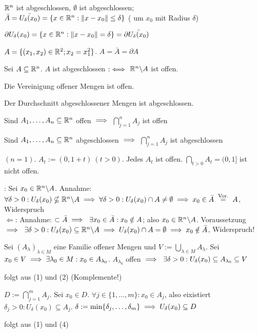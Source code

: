 \documentclass[a4paper,twoside,DIV15,BCOR12mm,chapterprefix=true,headings=twolinechapter]{scrbook}
\begin{document}
\begin{beispiele}
\item $\mathbb{R}^n$ ist abgeschlossen, $\emptyset$ ist abgeschlossen; \\ 
  $\bar{A}=\bar{U_\delta(x_0)} = \{x\in\mathbb{R}^n: \|x-x_0\| \le \delta\}$ ( um $x_0$ mit Radius $\delta$)
\item $\partial U_\delta(x_0) = \{x\in\mathbb{R}^n: \|x-x_0\|=\delta\} = \partial \bar{U_\delta(x_0)}$
\item $A = \{(x_1,x_2)\in\mathbb{R}^2; x_2 = x_1^2\}$. $A=\bar{A}=\partial A$
\end{beispiele}

\begin{satz}
 \begin{liste}
 \item Sei $A\subseteq\mathbb{R}^n$. $A$ ist abgeschlossen $:\iff$  $\mathbb{R}^n\backslash A$ ist offen.
 \item Die Vereinigung offener Mengen ist offen.
 \item Der Durchschnitt abgeschlossener Mengen ist abgeschlossen.
 \item Sind $A_1,\ldots,A_n\subseteq\mathbb{R}^n$ offen $\implies$ $\bigcap_{j=1}^nA_j$ ist offen
 \item Sind $A_1,\ldots,A_n\subseteq\mathbb{R}^n$ abgeschlossen $\implies$ $\bigcap_{j=1}^nA_j$ ist abgeschlossen
 \end{liste}
\end{satz}

\begin{beispiel}
  $(n=1)$. $A_t := (0,1+t)\ (t>0)$. Jedes $A_t$ ist offen. $\bigcap_{t>0}A_t = (0,1]$ ist nicht offen.
\end{beispiel}

\begin{beweise}
 \item \glqq\folgt\grqq: Sei $x_0\in\mathbb{R}^n\backslash A$. Annahme: $\forall \delta>0: U_\delta(x_0) \nsubseteq \MdR^n\backslash A\folgt\forall\delta>0: U_\delta(x_0)\cap A\ne\emptyset \folgt x_0\in\bar{A} \gleichnach{Vor.} A$, Widerspruch \\
 \glqq$\Leftarrow$\grqq: Annahme: $\subset\bar{A} \implies \ \exists x_0\in\bar{A}: x_0\notin A$; also $x_0\in\mathbb{R}^n\backslash A$. Voraussetzung $\implies \ \exists \delta > 0: U_\delta(x_0) \subseteq \mathbb{R}^n\backslash A \implies U_\delta(x_0) \cap A = \emptyset \implies x_0 \notin \bar{A}$, Widerspruch!
 \item Sei $(A_\lambda)_{\lambda\in M}$ eine Familie offener Mengen und $V := \bigcup_{\lambda\in M} A_\lambda$. Sei $x_0\in V \implies \exists\lambda_0\in M: x_0 \in A_{\lambda_0}$. $A_{\lambda_0}$ offen $\implies \ \exists \delta > 0: U_\delta(x_0) \subseteq A_{\lambda_0} \subseteq V$
 \item folgt aus (1) und (2) (Komplemente!)
 \item $D:=\bigcap_{j=1}^mA_j$. Sei $x_0\in D$. $\forall j\in\{1,\ldots,m\}: x_0\in A_j$, also eixistiert $\delta_j>0: U_\delta(x_0)\subseteq A_j$. $\delta := \min\{\delta_j,\ldots,\delta_m\} \implies U_\delta(x_0) \subseteq D$
 \item folgt aus (1) und (4)
\end{beweise}
\end{document}
